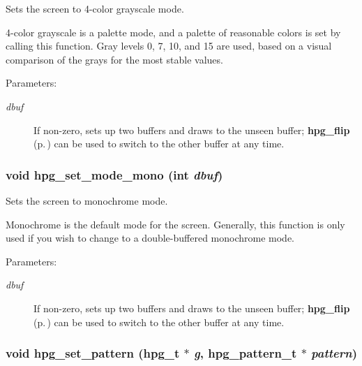 Sets the screen to 4-color grayscale mode.

4-color grayscale is a palette mode, and a palette of reasonable colors is set by calling this function. Gray levels 0, 7, 10, and 15 are used, based on a visual comparison of the grays for the most stable values.\begin{Desc}
\item[Parameters: ]\par
\begin{description}
\item[{\em 
dbuf}]If non-zero, sets up two buffers and draws to the unseen buffer; {\bf hpg\_\-flip} {\rm (p.\,\pageref{hpgraphics_8h_a34})} can be used to switch to the other buffer at any time. \end{description}
\end{Desc}
\subsubsection{\setlength{\rightskip}{0pt plus 5cm}void hpg\_\-set\_\-mode\_\-mono (int {\em dbuf})}\label{hpgraphics_8h_a30}


Sets the screen to monochrome mode.

Monochrome is the default mode for the screen. Generally, this function is only used if you wish to change to a double-buffered monochrome mode.\begin{Desc}
\item[Parameters: ]\par
\begin{description}
\item[{\em 
dbuf}]If non-zero, sets up two buffers and draws to the unseen buffer; {\bf hpg\_\-flip} {\rm (p.\,\pageref{hpgraphics_8h_a34})} can be used to switch to the other buffer at any time. \end{description}
\end{Desc}
\subsubsection{\setlength{\rightskip}{0pt plus 5cm}void hpg\_\-set\_\-pattern ({\bf hpg\_\-t} $\ast$ {\em g}, {\bf hpg\_\-pattern\_\-t} $\ast$ {\em pattern})}\label{hpgraphics_8h_a67}


